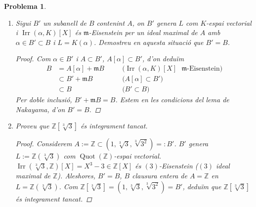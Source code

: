 \documentclass{article}
\DeclareMathOperator{\Quot}{Quot}
\DeclareMathOperator{\Irr}{Irr}
\newtheorem{problema}{Problema}
\begin{document}
\begin{problema}
\begin{enumerate}
\begin{proof}
\begin{align*}
            \end{align*}
            contradicció. Per tant, $\mathfrak{p}$ és l'únic ideal primer en la factorització de $\mathfrak{m}B$. Com $B$ domini de Dedekind, en particular $\dim_{Krull}(B)=1$. Per tant, $\mathfrak{p}$ és maximal, d'on resulta la primera part de l'enunciat.\newline
            Com $\mathfrak{m}B\subsetneq\mathfrak{m}B+\alpha B$ ideal de $B$ i $\mathfrak{m}B$ ideal maximal de $B$, deduïm que $\mathfrak{m}B+\alpha B=B$, d'on resulta la segona part de l'enunciat.
        \end{proof}
        \item Sigui $B'$ un subanell de $B$ contenint $A$, on $B'$ genera $L$ com $K$-espai vectorial i $\Irr(\alpha,K)[X]$ és $\mathfrak{m}$-Eisenstein per un ideal maximal de $A$ amb $\alpha\in B'\subset B$ i $L=K(\alpha)$. Demostreu en aquesta situació que $B'=B$.
        \begin{proof}
            Com $\alpha\in B'$ i $A\subset B'$, $A[\alpha]\subset B'$, d'on deduïm
            \begin{align*}
                B
                &=A[\alpha]+\mathfrak{m}B
                &\quad&\textrm{($\Irr(\alpha,K)[X]$ $\mathfrak{m}$-Eisenstein)}\\
                &\subset B'+\mathfrak{m}B
                &\quad&\textrm{($A[\alpha]\subset B'$)}\\
                &\subset B
                &\quad&\textrm{($B'\subset B$)}
            \end{align*}
            Per doble inclusió, $B'+\mathfrak{m}B=B$. Estem en les condicions del lema de Nakayama, d'on $B'=B$.
        \end{proof}
        \item Proveu que $\mathbb{Z}[\sqrt[3]{3}]$ és integrament tancat.
        \begin{proof}
            Considerem $A:=\mathbb{Z}\subset(1,\sqrt[3]{3},\sqrt[3]{3^{2}})=:B'$. $B'$ genera $L:=\mathbb{Z}(\sqrt[3]{3})$ com $\Quot(\mathbb{Z})$-espai vectorial. $\Irr(\sqrt[3]{3},\mathbb{Z})[X]=X^{3}-3\in\mathbb{Z}[X]$ és $(3)$-Eisenstein ($(3)$ ideal maximal de $\mathbb{Z}$). Aleshores, $B'=B$, $B$ clausura entera de $A=\mathbb{Z}$ en $L=\mathbb{Z}(\sqrt[3]{3})$. Com $\mathbb{Z}[\sqrt[3]{3}]=(1,\sqrt[3]{3},\sqrt[3]{3^{2}})=B'$, deduïm que $\mathbb{Z}[\sqrt[3]{3}]$ és integrament tancat.
        \end{proof}
    \end{enumerate}
\end{problema}
\end{document}
